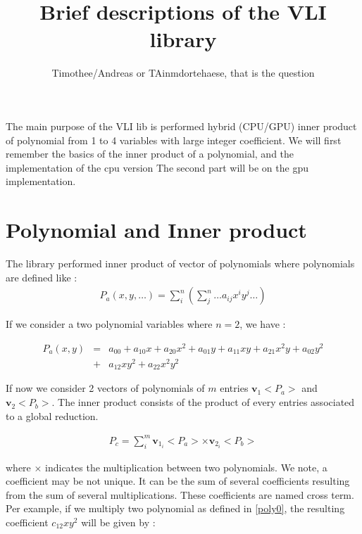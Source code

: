 \documentclass[11pt]{amsart}
\title{Brief descriptions of the VLI library}
\author{Timothee/Andreas or TAinmdortehaese, that is the question}
\begin{document}
\maketitle


The main purpose of the VLI lib is performed hybrid (CPU/GPU) inner product of polynomial from 1 to 4 variables with large integer coefficient. We will first remember the basics of the inner product of a polynomial, 
and the implementation of the cpu version  The second part will be on the gpu implementation.

\section*{Polynomial and Inner product}

The library performed inner product of vector of polynomials where polynomials are defined like :
\begin{eqnarray}
P_a(x,y,\dots) = \sum_i^n \left( \sum_j^n \dots a_{ij} x^i y^j \dots \right)
\end{eqnarray}

 If we consider a two  polynomial variables where $n=2$, we  have :

\begin{eqnarray}
P_a(x,y) &=&   a_{00} + a_{10}x + a_{20}x^2 + a_{01}y + a_{11} xy + a_{21}x^2y +  a_{02}y^2  \\
              &+ & a_{12}xy^2 + a_{22}x^2y^2 \nonumber \label{poly0}
\end{eqnarray}
 
 If now we consider 2 vectors of polynomials of $m$ entries  $\boldsymbol{v}_1<P_a>$ and  $\boldsymbol{v}_2<P_b>$. The inner product  consists of the product 
 of every entries  associated to a global reduction. 
 
 \begin{eqnarray}
 P_c = \sum_i^m \boldsymbol{v}_{1_i}<P_a>  \times  \boldsymbol{v}_{2_i}<P_b> \label{poly1}
\end{eqnarray}

where $\times$ indicates the multiplication between two polynomials. We  note, a coefficient may be not unique. It can be the sum of several coefficients resulting from the sum of several multiplications.
These coefficients are named cross term. Per example, if we multiply two polynomial as defined in \ref{poly0}, the resulting coefficient $c_{12}xy^2$ will be given by : 
\end{document}
